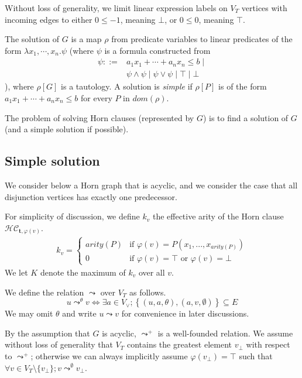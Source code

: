 \documentclass[a4paper,12pt]{article}
\begin{document}
Without loss of generality, we limit linear expression labels on $V_T$
vertices with incoming edges to either $0 \leq -1$, meaning $\bot$, or
$0 \leq 0$, meaning $\top$.

The solution of $G$ is a map $\rho$ from predicate variables to linear
predicates of the form $\lambda x_1, \cdots ,x_n. \psi $ (where $\psi$
is a formula constructed from
\begin{align*}
\psi ::= & a_1 x_1 + \cdots + a_n x_n \leq b \mid \\
& \psi \wedge \psi \mid \psi \vee \psi \mid \top \mid \bot
\end{align*}
), where $\rho[G]$ is a tautology. A solution is \textit{simple} if
$\rho[P]$ is of the form $a_1 x_1 + \cdots + a_n x_n \leq b$ for every
$P$ in $dom(\rho)$.

The problem of solving Horn clauses (represented by $G$) is to find a
solution of $G$ (and a simple solution if possible).

\subsection{Simple solution}

We consider below a Horn graph that is acyclic, and we consider the case
that all disjunction vertices has exactly one predecessor.

For simplicity of discussion, we define $k_v$ the effective arity of
the Horn clause $\mathcal{HC}_{\mathbf{t},\varphi(v)}$.
\begin{align*}
k_v =
\begin{cases}
arity(P) & \mbox{if } \varphi(v) = P(x_1,...,x_{arity(P)}) \\
0 & \mbox{if } \varphi(v) = \top \mbox { or } \varphi(v) = \bot
\end{cases}
\end{align*}
We let $K$ denote the maximum of $k_v$ over all $v$.

We define the relation $\leadsto$ over $V_T$ as follows.
\[ u \mathop{\leadsto}^\theta v \Longleftrightarrow
\exists a \in V_\vee; \left\lbrace (u,a,\theta), (a,v,\emptyset) \right\rbrace \subseteq E \]
We may omit $\theta$ and write $u \leadsto v$ for convenience in later
discussions.

By the assumption that $G$ is acyclic, $\leadsto^+$ is a
well-founded relation. We assume without loss of generality that $V_T$
contains the greatest element $v_\bot$ with respect to $\leadsto^+$;
otherwise we can always implicitly assume $\varphi(v_\bot) = \top$
such that $\forall v \in V_T \setminus \{v_\bot\}; v
\mathop{\leadsto}^\emptyset v_\bot$.
\end{document}

